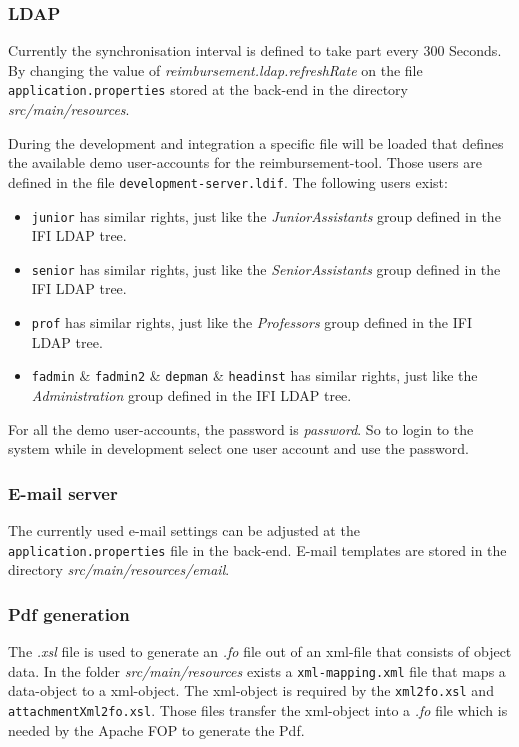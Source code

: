 \subsubsection{LDAP}
\label{subsubsec:ldap}

Currently the synchronisation interval is defined to take part every 300 Seconds. By changing the value of \textit{reimbursement.ldap.refreshRate} on the file \texttt{application.properties} stored at the back-end in the directory \textit{src/main/resources}. \par
During the development and integration a specific file will be loaded that defines the available demo user-accounts for the reimbursement-tool. Those users are defined in the file \texttt{development-server.ldif}. The following users exist:
\begin{itemize}
\item \texttt{junior} has similar rights, just like the \textit{JuniorAssistants} group defined in the IFI LDAP tree.
\item \texttt{senior} has similar rights, just like the \textit{SeniorAssistants} group defined in the IFI LDAP tree.
\item \texttt{prof} has similar rights, just like the \textit{Professors} group defined in the IFI LDAP tree.
\item \texttt{fadmin} \& \texttt{fadmin2} \& \texttt{depman} \& \texttt{headinst} has similar rights, just like the \textit{Administration} group defined in the IFI LDAP tree.
\end{itemize}

For all the demo user-accounts, the password is \textit{password}. So to login to the system while in development select one user account and use the password.

\subsubsection{E-mail server}
\label{subsubsec:email}

The currently used e-mail settings can be adjusted at the \texttt{application.properties} file in the back-end. E-mail templates are stored in the directory \textit{src/main/resources/email}.

\subsubsection{Pdf generation}
\label{subsubsec:pdf-xml-mappings}

The \textit{.xsl} file is used to generate an \textit{.fo} file out of an xml-file that consists of object data. In the folder \textit{src/main/resources} exists a \texttt{xml-mapping.xml} file that maps a data-object to a xml-object. The xml-object is required by the \texttt{xml2fo.xsl} and \texttt{attachmentXml2fo.xsl}. Those files transfer the xml-object into a \textit{.fo} file which is needed by the Apache FOP to generate the Pdf.


